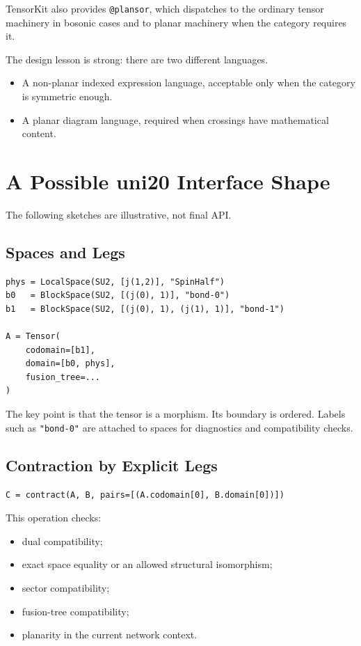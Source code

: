 \documentclass[11pt]{article}
\begin{document}
TensorKit also provides \texttt{@plansor}, which dispatches to the
ordinary tensor machinery in bosonic cases and to planar machinery when
the category requires it.

The design lesson is strong: there are two different languages.

\begin{itemize}
  \item A non-planar indexed expression language, acceptable only when
        the category is symmetric enough.
  \item A planar diagram language, required when crossings have
        mathematical content.
\end{itemize}

\section{A Possible uni20 Interface Shape}

The following sketches are illustrative, not final API.

\subsection{Spaces and Legs}

\begin{verbatim}
phys = LocalSpace(SU2, [j(1,2)], "SpinHalf")
b0   = BlockSpace(SU2, [(j(0), 1)], "bond-0")
b1   = BlockSpace(SU2, [(j(0), 1), (j(1), 1)], "bond-1")

A = Tensor(
    codomain=[b1],
    domain=[b0, phys],
    fusion_tree=...
)
\end{verbatim}

The key point is that the tensor is a morphism.  Its boundary is
ordered.  Labels such as \texttt{"bond-0"} are attached to spaces for
diagnostics and compatibility checks.

\subsection{Contraction by Explicit Legs}

\begin{verbatim}
C = contract(A, B, pairs=[(A.codomain[0], B.domain[0])])
\end{verbatim}

This operation checks:

\begin{itemize}[nosep]
  \item dual compatibility;
  \item exact space equality or an allowed structural isomorphism;
  \item sector compatibility;
  \item fusion-tree compatibility;
  \item planarity in the current network context.
\end{itemize}
\end{document}
